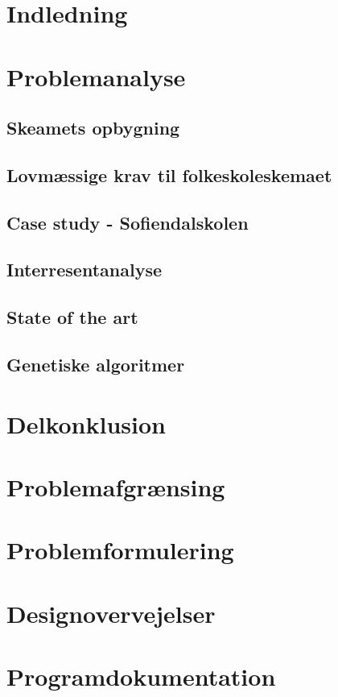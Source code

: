 \section{Indledning}
  

\section{Problemanalyse}
  

  \subsection{Skeamets opbygning}
    

  \subsection{Lovmæssige krav til folkeskoleskemaet}
    

  \subsection{Case study - Sofiendalskolen}
    

  \subsection{Interresentanalyse}
    

  \subsection{State of the art}
    

  \subsection {Genetiske algoritmer}
    

\section{Delkonklusion}
    
\newpage
\section{Problemafgrænsing}
    

\section{Problemformulering}
    

\section{Designovervejelser}
    

\section{Programdokumentation}
  